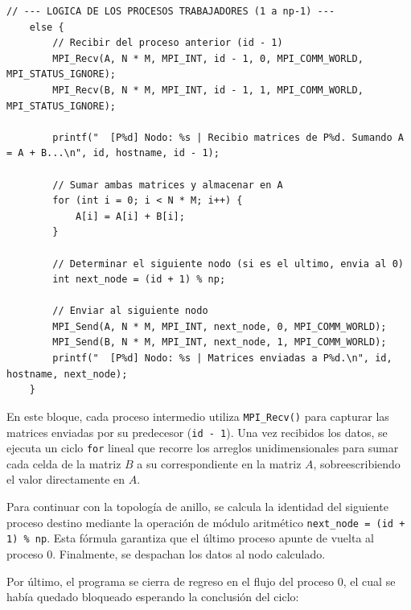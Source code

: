 \documentclass[letterpaper,11pt]{article}
\begin{document}
    \begin{lstlisting}[style=cstyle,caption={Recepcion, suma local y reenvio en procesos trabajadores},label={lst:programa-a}]
    // --- LOGICA DE LOS PROCESOS TRABAJADORES (1 a np-1) ---
    else {
        // Recibir del proceso anterior (id - 1)
        MPI_Recv(A, N * M, MPI_INT, id - 1, 0, MPI_COMM_WORLD, MPI_STATUS_IGNORE);
        MPI_Recv(B, N * M, MPI_INT, id - 1, 1, MPI_COMM_WORLD, MPI_STATUS_IGNORE);

        printf("  [P%d] Nodo: %s | Recibio matrices de P%d. Sumando A = A + B...\n", id, hostname, id - 1);

        // Sumar ambas matrices y almacenar en A
        for (int i = 0; i < N * M; i++) {
            A[i] = A[i] + B[i];
        }

        // Determinar el siguiente nodo (si es el ultimo, envia al 0)
        int next_node = (id + 1) % np;
        
        // Enviar al siguiente nodo
        MPI_Send(A, N * M, MPI_INT, next_node, 0, MPI_COMM_WORLD);
        MPI_Send(B, N * M, MPI_INT, next_node, 1, MPI_COMM_WORLD);
        printf("  [P%d] Nodo: %s | Matrices enviadas a P%d.\n", id, hostname, next_node);
    }
    \end{lstlisting}

    En este bloque, cada proceso intermedio utiliza \texttt{MPI\_Recv()} para capturar las matrices enviadas por su predecesor (\texttt{id - 1}). Una vez recibidos los datos, se ejecuta un ciclo \texttt{for} lineal que recorre los arreglos unidimensionales para sumar cada celda de la matriz $B$ a su correspondiente en la matriz $A$, sobreescribiendo el valor directamente en $A$. 
    
    Para continuar con la topología de anillo, se calcula la identidad del siguiente proceso destino mediante la operación de módulo aritmético \texttt{next\_node = (id + 1) \% np}. Esta fórmula garantiza que el último proceso apunte de vuelta al proceso 0. Finalmente, se despachan los datos al nodo calculado.

    Por último, el programa se cierra de regreso en el flujo del proceso 0, el cual se había quedado bloqueado esperando la conclusión del ciclo:
\end{document}
